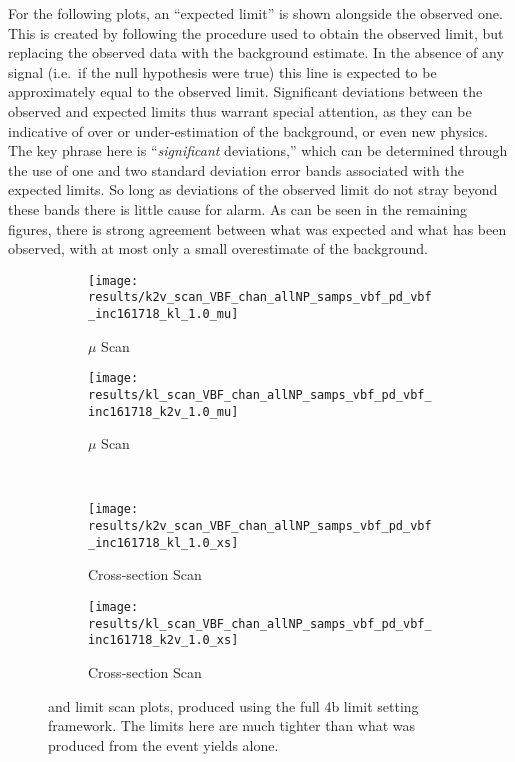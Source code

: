     For the following plots, an ``expected limit'' is shown alongside the observed one.
    This is created by following the procedure used to obtain the observed limit,
        but replacing the observed data with the background estimate.
    In the absence of any signal (i.e.\ if the null hypothesis were true)
        this line is expected to be approximately equal to the observed limit.
    Significant deviations between the observed and expected limits thus warrant special attention,
        as they can be indicative of over or under-estimation of the background,
        or even new physics.
    The key phrase here is ``\textit{significant} deviations,'' which can be determined through
        the use of one and two standard deviation error bands associated with the expected limits.
    So long as deviations of the observed limit do not stray beyond these bands
        there is little cause for alarm.
    As can be seen in the remaining figures, there is strong agreement between what was expected
        and what has been observed, with at most only a small overestimate of the background.


    \begin{figure}
        \centering
        \begin{subfigure}{0.48\textwidth} 
            \texttt{[image: results/k2v\_scan\_VBF\_chan\_allNP\_samps\_vbf\_pd\_vbf\_inc161718\_kl\_1.0\_mu]}
            \caption{\kvv $\mu$ Scan}
            \label{fig:mulimits_kvv_rooFit}
        \end{subfigure}
        \begin{subfigure}{0.48\textwidth}
            \texttt{[image: results/kl\_scan\_VBF\_chan\_allNP\_samps\_vbf\_pd\_vbf\_inc161718\_k2v\_1.0\_mu]}
            \caption{\kl $\mu$ Scan}
            \label{fig:mulimits_kl_rooFit}
        \end{subfigure}\\
        \begin{subfigure}{0.48\textwidth} 
            \texttt{[image: results/k2v\_scan\_VBF\_chan\_allNP\_samps\_vbf\_pd\_vbf\_inc161718\_kl\_1.0\_xs]}
            \caption{\kvv Cross-section Scan}
            \label{fig:xseclimits_kvv_rooFit}
        \end{subfigure}
        \begin{subfigure}{0.48\textwidth}
            \texttt{[image: results/kl\_scan\_VBF\_chan\_allNP\_samps\_vbf\_pd\_vbf\_inc161718\_k2v\_1.0\_xs]}
            \caption{\kl Cross-section Scan}
            \label{fig:xseclimits_kl_rooFit}
        \end{subfigure}
        \caption{
            \kvv and \kl limit scan plots, produced using the full 4b limit setting framework.
            The limits here are much tighter than what was produced from the event yields alone.
        }
    \end{figure}


